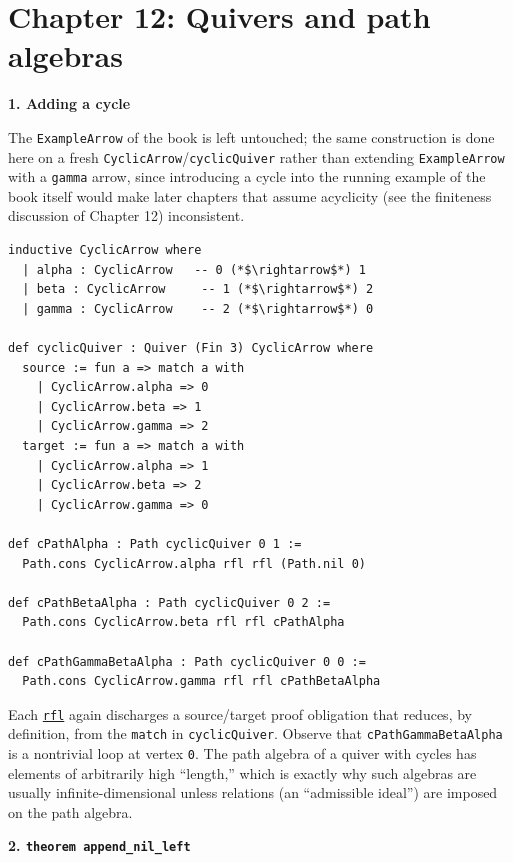 \section{Chapter 12: Quivers and path algebras}\label{sec:15-appendix-solutions:11-chapter-12:1}

\textbf{1. Adding a cycle}

The \texttt{ExampleArrow} of the book is left untouched; the same construction is done here on a fresh \texttt{CyclicArrow}/\texttt{cyclicQuiver} rather than extending \texttt{ExampleArrow} with a \texttt{gamma} arrow, since introducing a cycle into the running example of the book itself would make later chapters that assume acyclicity (see the finiteness discussion of Chapter 12) inconsistent.

\begin{lstlisting}
inductive CyclicArrow where
  | alpha : CyclicArrow   -- 0 (*$\rightarrow$*) 1
  | beta : CyclicArrow     -- 1 (*$\rightarrow$*) 2
  | gamma : CyclicArrow    -- 2 (*$\rightarrow$*) 0

def cyclicQuiver : Quiver (Fin 3) CyclicArrow where
  source := fun a => match a with
    | CyclicArrow.alpha => 0
    | CyclicArrow.beta => 1
    | CyclicArrow.gamma => 2
  target := fun a => match a with
    | CyclicArrow.alpha => 1
    | CyclicArrow.beta => 2
    | CyclicArrow.gamma => 0

def cPathAlpha : Path cyclicQuiver 0 1 :=
  Path.cons CyclicArrow.alpha rfl rfl (Path.nil 0)

def cPathBetaAlpha : Path cyclicQuiver 0 2 :=
  Path.cons CyclicArrow.beta rfl rfl cPathAlpha

def cPathGammaBetaAlpha : Path cyclicQuiver 0 0 :=
  Path.cons CyclicArrow.gamma rfl rfl cPathBetaAlpha
\end{lstlisting}

Each \href{https://lean-lang.org/doc/reference/latest/Tactic-Proofs/Tactic-Reference/}{\texttt{rfl}} again discharges a source/target proof obligation that reduces, by definition, from the \texttt{match} in \texttt{cyclicQuiver}. Observe that \texttt{cPathGammaBetaAlpha} is a nontrivial loop at vertex \texttt{0}. The path algebra of a quiver with cycles has elements of arbitrarily high ``length,'' which is exactly why such algebras are usually infinite-dimensional unless relations (an ``admissible ideal'') are imposed on the path algebra.

\textbf{2. \texttt{theorem append\_\allowbreak{}nil\_\allowbreak{}left}}

